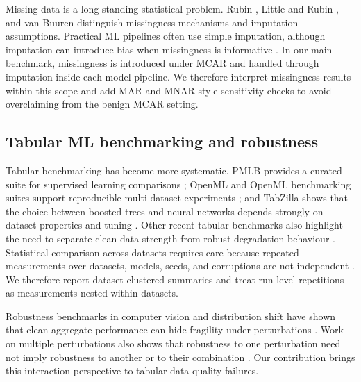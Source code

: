 \documentclass[preprint,12pt,number]{elsarticle}
\begin{document}
Missing data is a long-standing statistical problem. Rubin \citep{rubin1976inference}, Little and Rubin \citep{little2019statistical}, and van Buuren \citep{vanbuuren2018flexible} distinguish missingness mechanisms and imputation assumptions. Practical ML pipelines often use simple imputation, although imputation can introduce bias when missingness is informative \citep{schafer2002missing,sterne2009multiple}. In our main benchmark, missingness is introduced under MCAR and handled through imputation inside each model pipeline. We therefore interpret missingness results within this scope and add MAR and MNAR-style sensitivity checks to avoid overclaiming from the benign MCAR setting.

\subsection{Tabular ML benchmarking and robustness}

Tabular benchmarking has become more systematic. PMLB provides a curated suite for supervised learning comparisons \citep{olson2017pmlb}; OpenML and OpenML benchmarking suites support reproducible multi-dataset experiments \citep{vanschoren2014openml,bischl2021openml}; and TabZilla shows that the choice between boosted trees and neural networks depends strongly on dataset properties and tuning \citep{mcelfresh2023tabzilla}. Other recent tabular benchmarks also highlight the need to separate clean-data strength from robust degradation behaviour \citep{grinsztajn2022tree,shmuel2024comprehensive}. Statistical comparison across datasets requires care because repeated measurements over datasets, models, seeds, and corruptions are not independent \citep{demsar2006statistical,dietterich1998approximate,nadeau2003inference,bouthillier2021accounting,lones2024pitfalls}. We therefore report dataset-clustered summaries and treat run-level repetitions as measurements nested within datasets.

Robustness benchmarks in computer vision and distribution shift have shown that clean aggregate performance can hide fragility under perturbations \citep{hendrycks2019benchmarking,mu2019mnistc,koh2021wilds}. Work on multiple perturbations also shows that robustness to one perturbation need not imply robustness to another or to their combination \citep{tramer2019adversarial}. Our contribution brings this interaction perspective to tabular data-quality failures.


\end{document}
